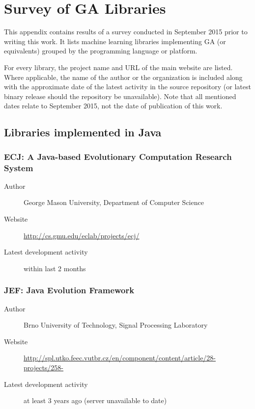 \chapter{Survey of GA Libraries}

This appendix contains results of a survey conducted in September 2015 prior to writing this work. It lists machine learning libraries implementing GA (or equivalents) grouped by the programming language or platform.

For every library, the project name and URL of the main website are listed. Where applicable, the name of the author or the organization is included along with the approximate date of the latest activity in the source repository (or latest binary release should the repository be unavailable). Note that all mentioned dates relate to September 2015, not the date of publication of this work.

\section{Libraries implemented in Java}

\subsection*{ECJ: A Java-based Evolutionary Computation Research System}
\begin{description}
    \item[Author] George Mason University, Department of Computer Science
    \item[Website] \url{http://cs.gmu.edu/eclab/projects/ecj/}
    \item[Latest development activity] within last 2 months
\end{description}


\subsection*{JEF: Java Evolution Framework}
\begin{description}
    \item[Author] Brno University of Technology, Signal Processing Laboratory
    \item[Website] \url{http://spl.utko.feec.vutbr.cz/en/component/content/article/28-projects/258-}
    \item[Latest development activity] at least 3 years ago (server unavailable to date)
\end{description}


